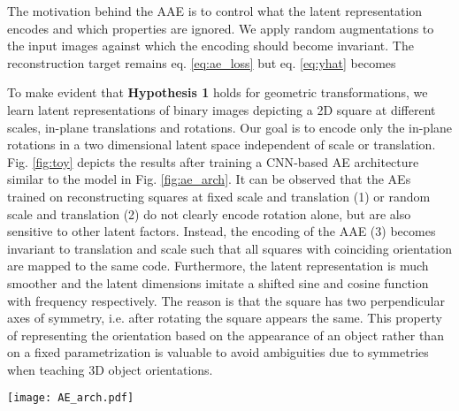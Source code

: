 The motivation behind the \gls{AAE} is to control what the latent representation encodes and which properties are ignored. We apply random augmentations  to the input images  against which the encoding should become invariant. The reconstruction target remains eq. \eqref{eq:ae_loss} but eq. \eqref{eq:yhat} becomes

To make evident that \textbf{Hypothesis 1} holds for geometric transformations, we learn latent representations of binary images depicting a 2D square at different scales, in-plane translations and rotations. Our goal is to encode only the in-plane rotations  in a two dimensional latent space  independent of scale or translation. Fig. \ref{fig:toy} depicts the results after training a \gls{CNN}-based \gls{AE} architecture similar to the model in Fig. \ref{fig:ae_arch}. It can be observed that the \glspl{AE} trained on reconstructing squares at fixed scale and translation (1) or random scale and translation (2) do not clearly encode rotation alone, but are also sensitive to other latent factors. Instead, the encoding of the \gls{AAE} (3) becomes invariant to translation and scale such that all squares with coinciding orientation are mapped to the same code. Furthermore, the latent representation is much smoother and the latent dimensions imitate a shifted sine and cosine function with frequency  respectively. The reason is that the square has two perpendicular axes of symmetry, i.e. after rotating  the square appears the same. This property of representing the orientation based on the appearance of an object rather than on a fixed parametrization is valuable to avoid ambiguities due to symmetries when teaching 3D object orientations.

\begin{figure*}[t]\centering
	\captionsetup{width=\textwidth}
	\texttt{[image: AE\_arch.pdf]}
	\caption{Autoencoder CNN architecture with occluded test input, "resize2x" depicts nearest-neighbor upsampling}
	\label{fig:ae_arch}
\end{figure*}
